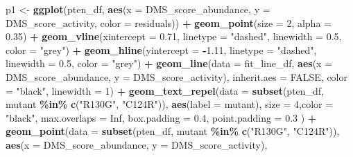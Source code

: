 \documentclass[
]{article}
\newenvironment{Shaded}{\begin{snugshade}}{\end{snugshade}}
\newcommand{\AttributeTok}[1]{\textcolor[rgb]{0.13,0.29,0.53}{#1}}
\newcommand{\ConstantTok}[1]{\textcolor[rgb]{0.56,0.35,0.01}{#1}}
\newcommand{\DecValTok}[1]{\textcolor[rgb]{0.00,0.00,0.81}{#1}}
\newcommand{\FloatTok}[1]{\textcolor[rgb]{0.00,0.00,0.81}{#1}}
\newcommand{\FunctionTok}[1]{\textcolor[rgb]{0.13,0.29,0.53}{\textbf{#1}}}
\newcommand{\NormalTok}[1]{#1}
\newcommand{\OtherTok}[1]{\textcolor[rgb]{0.56,0.35,0.01}{#1}}
\newcommand{\SpecialCharTok}[1]{\textcolor[rgb]{0.81,0.36,0.00}{\textbf{#1}}}
\newcommand{\StringTok}[1]{\textcolor[rgb]{0.31,0.60,0.02}{#1}}
\begin{document}
\begin{Shaded}
\begin{Highlighting}[]
\NormalTok{p1 }\OtherTok{\textless{}{-}} \FunctionTok{ggplot}\NormalTok{(pten\_df, }\FunctionTok{aes}\NormalTok{(}\AttributeTok{x =}\NormalTok{ DMS\_score\_abundance, }\AttributeTok{y =}\NormalTok{ DMS\_score\_activity, }\AttributeTok{color =}\NormalTok{ residuals)) }\SpecialCharTok{+}
  \FunctionTok{geom\_point}\NormalTok{(}\AttributeTok{size =} \DecValTok{2}\NormalTok{, }\AttributeTok{alpha =} \FloatTok{0.35}\NormalTok{) }\SpecialCharTok{+}
  \FunctionTok{geom\_vline}\NormalTok{(}\AttributeTok{xintercept =} \FloatTok{0.71}\NormalTok{, }\AttributeTok{linetype =} \StringTok{"dashed"}\NormalTok{, }\AttributeTok{linewidth =} \FloatTok{0.5}\NormalTok{, }\AttributeTok{color =} \StringTok{"grey"}\NormalTok{) }\SpecialCharTok{+}
  \FunctionTok{geom\_hline}\NormalTok{(}\AttributeTok{yintercept =} \SpecialCharTok{{-}}\FloatTok{1.11}\NormalTok{, }\AttributeTok{linetype =} \StringTok{"dashed"}\NormalTok{, }\AttributeTok{linewidth =} \FloatTok{0.5}\NormalTok{, }\AttributeTok{color =} \StringTok{"grey"}\NormalTok{) }\SpecialCharTok{+}
  \FunctionTok{geom\_line}\NormalTok{(}\AttributeTok{data =}\NormalTok{ fit\_line\_df, }\FunctionTok{aes}\NormalTok{(}\AttributeTok{x =}\NormalTok{ DMS\_score\_abundance, }\AttributeTok{y =}\NormalTok{ DMS\_score\_activity),}
            \AttributeTok{inherit.aes =} \ConstantTok{FALSE}\NormalTok{, }\AttributeTok{color =} \StringTok{"black"}\NormalTok{, }\AttributeTok{linewidth =} \DecValTok{1}\NormalTok{) }\SpecialCharTok{+}
    \FunctionTok{geom\_text\_repel}\NormalTok{(}\AttributeTok{data =} \FunctionTok{subset}\NormalTok{(pten\_df, mutant }\SpecialCharTok{\%in\%} \FunctionTok{c}\NormalTok{(}\StringTok{"R130G"}\NormalTok{, }\StringTok{"C124R"}\NormalTok{)),}
                  \FunctionTok{aes}\NormalTok{(}\AttributeTok{label =}\NormalTok{ mutant),}
                  \AttributeTok{size =} \DecValTok{4}\NormalTok{,}\AttributeTok{color =} \StringTok{"black"}\NormalTok{,}
                  \AttributeTok{max.overlaps =} \ConstantTok{Inf}\NormalTok{, }\AttributeTok{box.padding =} \FloatTok{0.4}\NormalTok{, }\AttributeTok{point.padding =} \FloatTok{0.3}
\NormalTok{  ) }\SpecialCharTok{+}
  \FunctionTok{geom\_point}\NormalTok{(}\AttributeTok{data =} \FunctionTok{subset}\NormalTok{(pten\_df, mutant }\SpecialCharTok{\%in\%} \FunctionTok{c}\NormalTok{(}\StringTok{"R130G"}\NormalTok{, }\StringTok{"C124R"}\NormalTok{)),}
             \FunctionTok{aes}\NormalTok{(}\AttributeTok{x =}\NormalTok{ DMS\_score\_abundance, }\AttributeTok{y =}\NormalTok{ DMS\_score\_activity),}

\end{Highlighting}
\end{Shaded}
\end{document}
